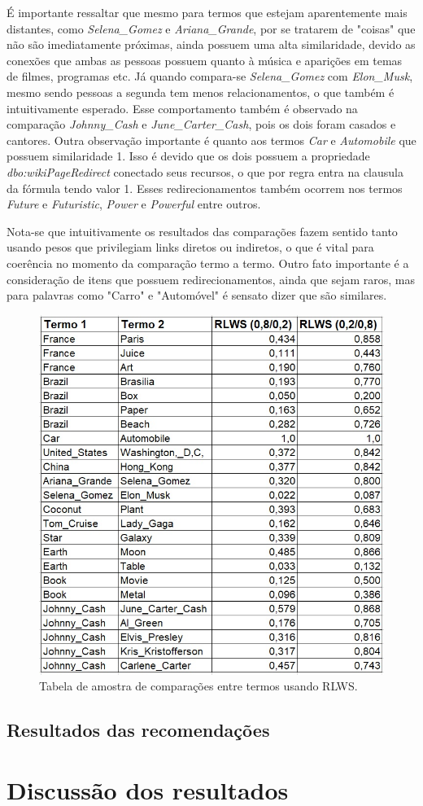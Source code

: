 É importante ressaltar que mesmo para termos que estejam aparentemente mais distantes, como \textit{Selena\_Gomez} e \textit{Ariana\_Grande}, por se tratarem de "coisas" que não são imediatamente próximas, ainda possuem uma alta similaridade, devido as conexões que ambas as pessoas possuem quanto à música e aparições em temas de filmes, programas etc. Já quando compara-se \textit{Selena\_Gomez} com \textit{Elon\_Musk}, mesmo sendo pessoas a segunda tem menos relacionamentos, o que também é intuitivamente esperado. Esse comportamento também é observado na comparação \textit{Johnny\_Cash} e \textit{June\_Carter\_Cash}, pois os dois foram casados e cantores. Outra observação importante é quanto aos termos \textit{Car} e \textit{Automobile} que possuem similaridade 1. Isso é devido que os dois possuem a propriedade \textit{dbo:wikiPageRedirect} conectado seus recursos, o que por regra entra na clausula da fórmula tendo valor 1. Esses redirecionamentos também ocorrem nos  termos \textit{Future} e \textit{Futuristic}, \textit{Power} e \textit{Powerful} entre outros.

Nota-se que intuitivamente os resultados das comparações fazem sentido tanto usando pesos que privilegiam links diretos ou indiretos, o que é vital para coerência no momento da comparação termo a termo. Outro fato importante é a consideração de itens que possuem redirecionamentos, ainda que sejam raros, mas para palavras como "Carro" e "Automóvel" é sensato dizer que são similares.

\begin{figure}
	\centering
	\includegraphics[scale=0.7]{imagens/rlws_results.jpg}
	\caption{Tabela de amostra de comparações entre termos usando \ac{RLWS}.}
	\label{fig:rlws_results}
\end{figure}

\subsection{Resultados das recomendações}

\section{Discussão dos resultados}
